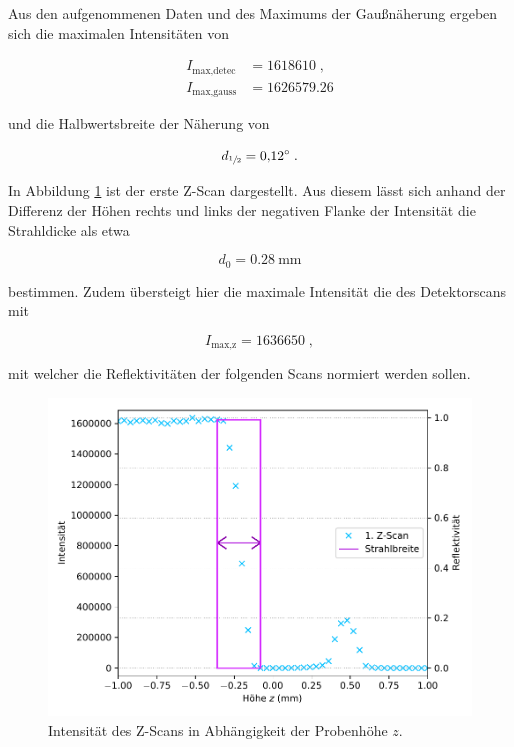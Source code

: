 Aus den aufgenommenen Daten und des Maximums der Gaußnäherung ergeben sich die maximalen
Intensitäten von 
\vspace{-25pt}

\begin{align*}
    I_\text{max,detec} &= \num{1618610} \; ,\\
    I_\text{max,gauss} &= \num{1626579.26}
\end{align*}

und die Halbwertsbreite der Näherung von

\begin{equation*}
    d_{\sfrac{1}{2}} = \SI{0.12}{\degree} \; .
\end{equation*}

In Abbildung \ref{fig:plot21} ist der erste Z-Scan dargestellt.
Aus diesem lässt sich anhand der Differenz der Höhen rechts und links der negativen Flanke der Intensität
die Strahldicke als etwa

\begin{equation*}
    d_0 = \SI{0.28}{\milli\meter}
\end{equation*}

bestimmen. Zudem übersteigt hier die maximale Intensität die des Detektorscans mit 

\begin{equation}
    I_\text{max,z} = \num{1636650} \; ,
    \label{eqn:imax}
\end{equation}

mit welcher die Reflektivitäten der folgenden Scans normiert werden sollen.

\begin{figure}[H]
    \centering
    \includegraphics[scale=0.7]{content/plot21.pdf}
    \vspace{-10pt}
    \caption{Intensität des Z-Scans in Abhängigkeit der Probenhöhe $z$.}
    \label{fig:plot21}
\end{figure}

